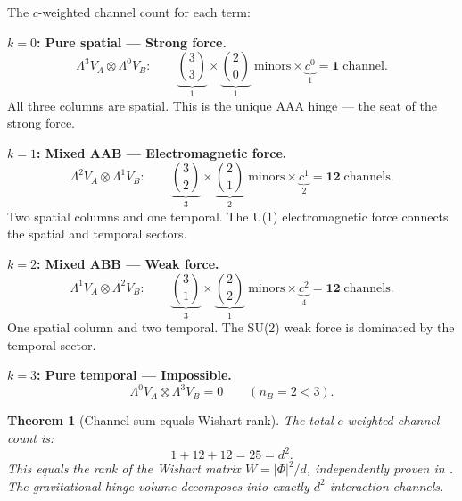 \documentclass[12pt]{article}
\newtheorem{theorem}{Theorem}[section]
\theoremstyle{remark}
\theoremstyle{definition}
\begin{document}
The $c$-weighted channel count for each term:

\bigskip

\noindent\textbf{$k = 0$: Pure spatial --- Strong force.}
\begin{equation}
\Lambda^3 V_A \otimes \Lambda^0 V_B: \qquad \underbrace{\binom{3}{3}}_1 \times \underbrace{\binom{2}{0}}_1 \;\text{minors} \times \underbrace{c^0}_1 = \mathbf{1}\;\text{channel}.
\end{equation}
All three columns are spatial. This is the unique AAA hinge --- the seat of the strong force.

\bigskip

\noindent\textbf{$k = 1$: Mixed AAB --- Electromagnetic force.}
\begin{equation}
\Lambda^2 V_A \otimes \Lambda^1 V_B: \qquad \underbrace{\binom{3}{2}}_3 \times \underbrace{\binom{2}{1}}_2 \;\text{minors} \times \underbrace{c^1}_2 = \mathbf{12}\;\text{channels}.
\end{equation}
Two spatial columns and one temporal. The U(1) electromagnetic force connects the spatial and temporal sectors.

\bigskip

\noindent\textbf{$k = 2$: Mixed ABB --- Weak force.}
\begin{equation}
\Lambda^1 V_A \otimes \Lambda^2 V_B: \qquad \underbrace{\binom{3}{1}}_3 \times \underbrace{\binom{2}{2}}_1 \;\text{minors} \times \underbrace{c^2}_4 = \mathbf{12}\;\text{channels}.
\end{equation}
One spatial column and two temporal. The SU(2) weak force is dominated by the temporal sector.

\bigskip

\noindent\textbf{$k = 3$: Pure temporal --- Impossible.}
\begin{equation}
\Lambda^0 V_A \otimes \Lambda^3 V_B = 0 \qquad (n_B = 2 < 3).
\end{equation}

\bigskip

\begin{theorem}[Channel sum equals Wishart rank]
\label{thm:25}
The total $c$-weighted channel count is:
\begin{equation}
\boxed{1 + 12 + 12 = 25 = d^2.}
\end{equation}
This equals the rank of the Wishart matrix $W = |\Phi|^2/d$, independently proven in \cite{Wishart}. The gravitational hinge volume decomposes into exactly $d^2$ interaction channels.
\end{theorem}
\end{document}

